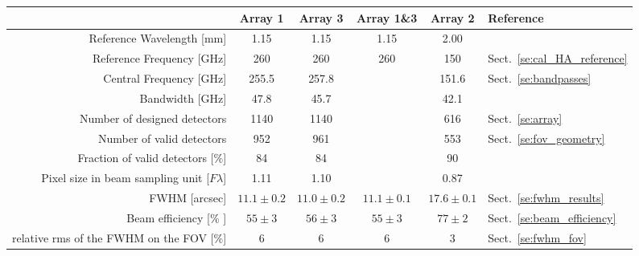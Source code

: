 \begin{table}[h]
\begin{center}    
  \begin{threeparttable}
    \begin{tabular}{|r|c|c|c|c|l|}
      \hline
      & Array 1 & Array 3  & Array 1\&3 & Array 2 & Reference \\
      \hline
      \hline
      Reference Wavelength  [mm]  &  1.15    &  1.15   & 1.15  & 2.00   &   \\
      Reference Frequency  [GHz]  &  260    &  260   & 260  & 150   &  Sect.~\ref{se:cal_HA_reference}  \\
      Central Frequency [GHz]     &  255.5  &  257.8 &      & 151.6 &  Sect.~\ref{se:bandpasses}  \\
      Bandwidth         [GHz]     &  47.8   &  45.7  &      & 42.1  &   \\
      \hline
      Number of designed detectors                   & 1140      &  1140    &    &    616  & Sect.~\ref{se:array}\\
      Number of valid detectors                      &  952      &   961    &    &    553  & Sect.~\ref{se:fov_geometry}\\
      Fraction of valid detectors [$\%$]             &  84       &   84     &    &     90  & \\
      Pixel size in beam sampling unit\tnote{(a)}\hspace{3mm} [$F\lambda$] & 1.11 & 1.10  &  &  0.87 & \\
      \hline
      FWHM\tnote{(b)}\hspace{3mm} [arcsec]    &  $11.1 \pm 0.2$   &  $11.0 \pm 0.2$  &   $11.1 \pm 0.1$  &  $17.6 \pm 0.1$  &  Sect.~\ref{se:fwhm_results}\\
      Beam efficiency\tnote{(c)}\hspace{3mm} [\% ] &  $55 \pm 3$  &  $56 \pm 3$   &  $55 \pm 3$   &  $77 \pm 2$  &  Sect.~\ref{se:beam_efficiency}\\
      relative rms of the FWHM on the FOV [$\%$]          &    6         &      6        &       6        &      3        & Sect.~\ref{se:fwhm_fov}\\

\end{tabular}
\end{threeparttable}
\end{center}
\end{table}
